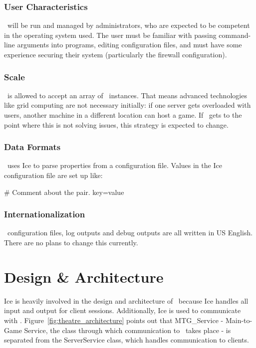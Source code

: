 \subsubsection*{User Characteristics}

\GameServer\ will be run and managed by administrators, who are expected to be competent in the operating system used. The user must be familiar with passing command-line arguments into programs, editing configuration files, and must have some experience securing their system (particularly the firewall configuration).

\subsubsection*{Scale}

\MainServer\ is allowed to accept an array of \GameServer\ instances. That means advanced technologies like grid computing are not necessary initially: if one server gets overloaded with users, another machine in a different location can host a game. If \VTank\ gets to the point where this is not solving issues, this strategy is expected to change.

\subsubsection*{Data Formats}

\GameServer\ uses Ice to parse properties from a configuration file. Values in the Ice configuration file are set up like:

\# Comment about the pair.
key=value

\subsubsection*{Internationalization}

\GameServer\ configuration files, log outputs and debug outputs are all written in US English. There are no plans to change this currently.

\section{Design \& Architecture}

Ice is heavily involved in the design and architecture of \GameServer\ because Ice handles all input and output for client sessions. Additionally, Ice is used to communicate with \MainServer. Figure~\ref{fig:theatre_architecture} points out that MTG\_Service - Main-to-Game Service, the class through which communication to \MainServer\ takes place - is separated from the ServerService class, which handles communication to clients. 

